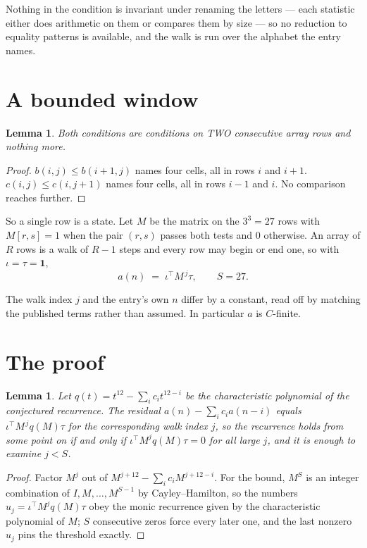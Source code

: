 \documentclass[11pt,a4paper]{article}
\theoremstyle{plain}
\newtheorem{lemma}[theorem]{Lemma}
\theoremstyle{definition}
\begin{document}
Nothing in the condition is invariant under renaming the letters --- each statistic either does
arithmetic on them or compares them by size --- so no reduction to equality patterns is
available, and the walk is run over the alphabet the entry names.

\section{A bounded window}

\begin{lemma}\label{lem:win}
Both conditions are conditions on TWO consecutive array rows and nothing more.
\end{lemma}

\begin{proof}
$b(i,j)\le b(i{+}1,j)$ names four cells, all in rows $i$ and $i+1$. $c(i,j)\le c(i,j{+}1)$
names four cells, all in rows $i-1$ and $i$. No comparison reaches further.
\end{proof}

So a single row is a state. Let $M$ be the matrix on the $3^{3}=27$ rows with
$M[r,s]=1$ when the pair $(r,s)$ passes both tests and $0$ otherwise. An array of $R$ rows is a
walk of $R-1$ steps and every row may begin or end one, so with $\iota=\tau=\mathbf{1}$,
\[
a(n)\;=\;\iota^{\!\top}M^{\,j}\tau ,\qquad S=27.
\]

The walk index $j$ and the entry's own $n$ differ by a constant, read off by matching the
published terms rather than assumed. In particular $a$ is $C$-finite.

\section{The proof}

\begin{lemma}\label{lem:crit}
Let $q(t)=t^{12}-\sum_i c_it^{12-i}$ be the characteristic polynomial of the
conjectured recurrence. The residual $a(n)-\sum_ic_ia(n-i)$ equals
$\iota^{\!\top}M^{\,j}q(M)\tau$ for the corresponding walk index $j$, so the recurrence
holds from some point on if and only if $\iota^{\!\top}M^{j}q(M)\tau=0$ for all large $j$,
and it is enough to examine $j<S$.
\end{lemma}

\begin{proof}
Factor $M^{j}$ out of $M^{j+12}-\sum_ic_iM^{j+12-i}$. For the bound, $M^{S}$
is an integer combination of $I,M,\dots,M^{S-1}$ by Cayley--Hamilton, so the numbers
$u_j=\iota^{\!\top}M^{j}q(M)\tau$ obey the monic recurrence given by the characteristic
polynomial of $M$; $S$ consecutive zeros force every later one, and the last nonzero $u_j$
pins the threshold exactly.
\end{proof}
\end{document}
